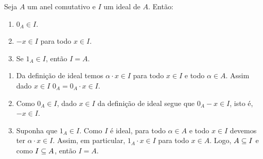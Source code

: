 \documentclass{beamer}
\begin{document}
    \begin{frame}
        \begin{proposicao}
            Seja $A$ um anel comutativo e $I$ um ideal de $A$. Ent{\~a}o:
            \begin{enumerate}[label={\roman*})]
                \item $0_{A}\in I$.
                \item $-x \in I$ para todo $x \in I$.
                \item Se $1_A \in I$, ent\~ao $I = A$.
            \end{enumerate}
        \end{proposicao}
        \begin{prova}
            \begin{enumerate}[label={\roman*})]
                \item Da defini\c{c}\~ao de ideal temos $\alpha \cdot x \in I$ para todo $x \in I$ e todo $\alpha \in A$.
                Assim dado $x \in I$ $0_A = 0_A \cdot x \in I$.

                \item Como $0_A \in I$, dado $x \in I$ da defini\c{c}\~ao de ideal segue que $0_A - x \in I$, isto \'e, $-x \in I$.

                \item Suponha que $1_A \in I$. Como $I$ {\'e} ideal, para todo $\alpha \in A$ e todo $x \in I$ devemos ter $\alpha\cdot x \in I$. Assim, em particular, $1_A \cdot x \in I$ para todo $x \in A$. Logo, $A\subseteq I$ e como $I\subseteq A$, ent{\~a}o $I = A$.
            \end{enumerate}
        \end{prova}
    \end{frame}
\end{document}
